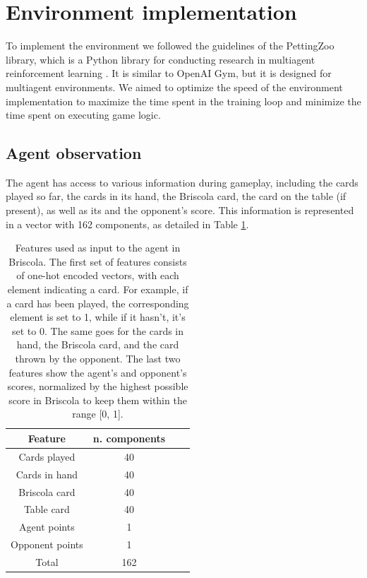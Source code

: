 \section{Environment implementation}
To implement the environment we followed the guidelines of the PettingZoo library, which is a Python library for conducting research in multiagent reinforcement learning \cite{pettingzoo}. It is similar to OpenAI Gym, but it is designed for multiagent environments. We aimed to optimize the speed of the environment implementation to maximize the time spent in the training loop and minimize the time spent on executing game logic.

\subsection{Agent observation}
The agent has access to various information during gameplay, including the cards played so far, the cards in its hand, the Briscola card, the card on the table (if present), as well as its and the opponent's score. This information is represented in a vector with 162 components, as detailed in Table \ref{tab:state}.

\begin{table}[H]
    \centering
    \begin{tabular}{c c c c}
        \hline
        Feature         & n. components \\
        \hline
        Cards played    & 40            \\
        Cards in hand   & 40            \\
        Briscola card   & 40            \\
        Table card      & 40            \\
        \hline
        Agent points    & 1             \\
        Opponent points & 1             \\
        \hline
        Total           & 162           \\
        \hline
    \end{tabular}

    \caption{Features used as input to the agent in Briscola. The first set of features consists of one-hot encoded vectors, with each element indicating a card. For example, if a card has been played, the corresponding element is set to 1, while if it hasn't, it's set to 0. The same goes for the cards in hand, the Briscola card, and the card thrown by the opponent. The last two features show the agent's and opponent's scores, normalized by the highest possible score in Briscola to keep them within the range [0, 1].}
    \label{tab:state}
\end{table}

